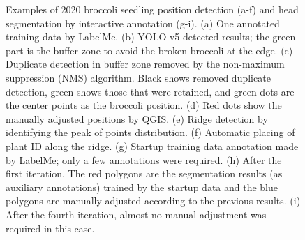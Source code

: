 \begin{figure}[htb]
  \begin{center}
  \end{center}
  \caption[Examples of 2020 broccoli seedling position detection and head segmentation by interactive annotation]{
    Examples of 2020 broccoli seedling position detection (a-f) and head segmentation by interactive annotation (g-i). 
    (a) One annotated training data by LabelMe. 
    (b) YOLO v5 detected results; the green part is the buffer zone to avoid the broken broccoli at the edge. 
    (c) Duplicate detection in buffer zone removed by the non-maximum suppression (NMS) algorithm. Black shows removed duplicate detection, green shows those that were retained, and green dots are the center points as the broccoli position. 
    (d) Red dots show the manually adjusted positions by QGIS. 
    (e) Ridge detection by identifying the peak of points distribution. 
    (f) Automatic placing of plant ID along the ridge. 
    (g) Startup training data annotation made by LabelMe; only a few annotations were required. 
    (h) After the first iteration. The red polygons are the segmentation results (as auxiliary annotations) trained by the startup data and the blue polygons are manually adjusted according to the previous results. 
    (i) After the fourth iteration, almost no manual adjustment was required in this case.
  }
  \label{fig:cp4s1}
\end{figure}